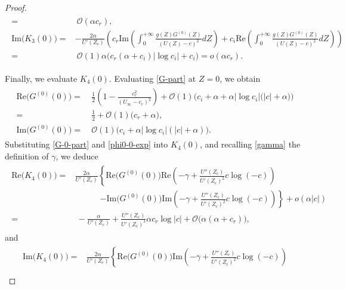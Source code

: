 \documentclass[10pt,a4paper]{amsart}
\begin{document}
\begin{proof}
\begin{align}
\begin{aligned}
					=&~\mathcal{O}(\alpha c_r),\\
					\text{Im}\big(K_3(0)\big) =& -\frac{2\alpha}{U'(Z_c)}\left(c_r\text{Im}\left(\int_{0}^{+\infty}\frac{g(Z)G^{(0)}(Z)}{(U(Z)-c)^2}dZ\right) +c_i\text{Re}\left(\int_{0}^{+\infty}\frac{g(Z)G^{(0)}(Z)}{(U(Z)-c)^2}dZ\right) \right)\\
					=&~\mathcal{O}(1)\alpha\Big(c_r(\alpha+c_i)|\log c_i|+c_i\Big)=o(\alpha c_r).
			\end{aligned}\end{align}
		
		
Finally, we evaluate $K_4(0)$. Evaluating \eqref{G-part} at $Z=0$, we obtain 
			\begin{align}\label{G-0-part}\begin{aligned}
					\text{Re}\big( G^{(0)}(0)\big)= &~ \frac{1}{2}\left(1-\frac{c_r^2}{(U_\infty-c_r)^2}\right) +\mathcal{O}(1)\Big(c_i+\alpha+\alpha|\log c_i|\big(|c|+\alpha\big)\Big)\\
					=&~\frac{1}{2}+\mathcal{O}(1)\big(c_r+\alpha\big),\\%
					\text{Im}\big( G^{(0)}(0)\big)
					=&~\mathcal{O}(1)\big(c_i+\alpha|\log c_i|(|c|+\alpha)\big).
			\end{aligned}\end{align}
Substituting \eqref{G-0-part} and \eqref{phi0-0-exp} into $K_4(0)$, and recalling \eqref{gamma} the definition of $\gamma$, we deduce
			\begin{align}\label{K4-0-im}\begin{aligned}
					\text{Re}\big(K_4(0)\big) =& \frac{2\alpha}{U'(Z_c)}\left\{\text{Re}\big(G^{(0)}(0)\big) \text{Re}\left(-\gamma+\frac{U''(Z_c)}{U'(Z_c)^2}c\log(-c)\right)\right.\\
					&\qquad\quad \left.-\text{Im}\big(G^{(0)}(0)\big) \text{Im}\left(-\gamma+\frac{U''(Z_c)}{U'(Z_c)^2}c\log(-c)\right)\right\}+o(\alpha|c|)\\
					=&~-\frac{\alpha}{U'(Z_c)}+\frac{U''(Z_c)}{U'(Z_c)^3} \alpha c_r\log|c|+\mathcal{O}\big(\alpha (\alpha+c_r)\big),
			\end{aligned}
		\end{align}
	and
	\begin{align}\begin{aligned}\label{K4-0-re}
					\text{Im}\big(K_4(0)\big) =& \frac{2\alpha}{U'(Z_c)}\left\{\text{Re}\big(G^{(0)}(0)\big) \text{Im}\left(-\gamma+\frac{U''(Z_c)}{U'(Z_c)^2}c\log(-c)\right)\right.\\

\end{aligned}
\end{align}
\end{proof}
\end{document}

